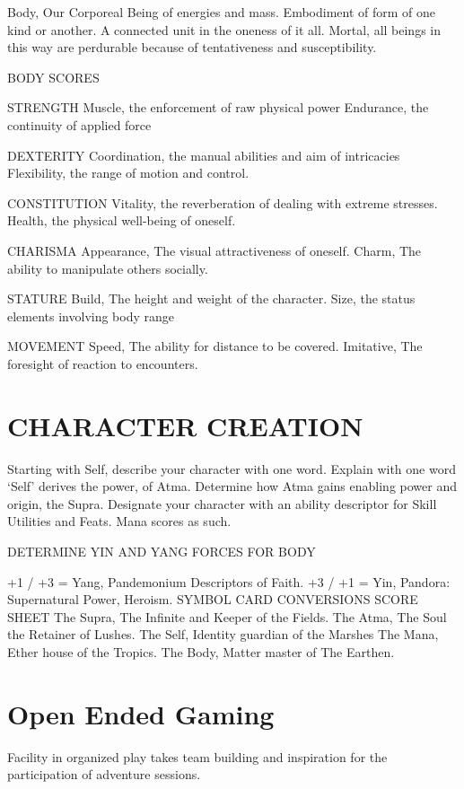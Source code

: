 \documentclass{article}
\begin{document}
Body, Our Corporeal Being of energies and mass. Embodiment of form of one kind or
another. A connected unit in the oneness of it all. Mortal, all beings in this way are perdurable
because of tentativeness and susceptibility.

BODY SCORES

STRENGTH
Muscle, the enforcement of raw physical power
Endurance, the continuity of applied force

DEXTERITY
Coordination, the manual abilities and aim of intricacies
Flexibility, the range of motion and control.

CONSTITUTION
Vitality, the reverberation of dealing with extreme stresses.
Health, the physical well-being of oneself.

CHARISMA
Appearance, The visual attractiveness of oneself.
Charm, The ability to manipulate others socially.

STATURE
Build, The height and weight of the character.
Size, the status elements involving body range

MOVEMENT
Speed, The ability for distance to be covered.
Imitative, The foresight of reaction to encounters.

\section{CHARACTER CREATION}

Starting with Self, describe your character with one word.
Explain with one word ‘Self’ derives the power, of Atma.
Determine how Atma gains enabling power and origin, the Supra.
Designate your character with an ability descriptor for Skill Utilities and Feats. Mana scores as
such.

DETERMINE YIN AND YANG FORCES FOR BODY

+1 / +3 = Yang, Pandemonium Descriptors of Faith.
+3 / +1 = Yin, Pandora: Supernatural Power, Heroism.
SYMBOL CARD CONVERSIONS SCORE SHEET
 The Supra, The Infinite and Keeper of the Fields.
 The Atma, The Soul the Retainer of Lushes.
 The Self, Identity guardian of the Marshes
 The Mana, Ether house of the Tropics.
 The Body, Matter master of The Earthen.




\section{Open Ended Gaming}

Facility in organized play takes team building and inspiration for the participation of adventure sessions.
\end{document}
